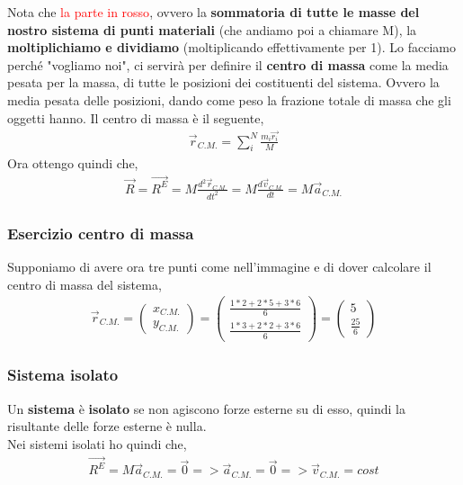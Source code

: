         Nota che \textcolor{Red}{la parte in rosso}, ovvero la \textbf{sommatoria di tutte le masse del nostro sistema di punti materiali} (che andiamo poi a chiamare M), la \textbf{moltiplichiamo e dividiamo} (moltiplicando effettivamente per 1). Lo facciamo perché "vogliamo noi", ci servirà per definire il \textbf{centro di massa} come la media pesata per la massa, di tutte le posizioni dei costituenti del sistema. Ovvero la media pesata delle posizioni, dando come peso la frazione totale di massa che gli oggetti hanno. Il centro di massa è il seguente,
        \begin{align*}
            \vec{r}_{C.M.}=\sum_i^N \frac{m_i\vec{r_i}}{M}
        \end{align*}
        Ora ottengo quindi che,
        \begin{align*}
            \vec{R}=\vec{R^E}=M\frac{d^2\vec{r}_{C.M.}}{dt^2}=M\frac{d\vec{v}_{C.M.}}{dt}=M\vec{a}_{C.M.}
        \end{align*}

        \subsubsection{Esercizio centro di massa}
        Supponiamo di avere ora tre punti come nell'immagine e di dover calcolare il centro di massa del sistema,
        \begin{align*}
            \vec{r}_{C.M.}=
            \left(\begin{array}{c}x_{C.M.} \\y_{C.M.}\end{array} \right)=
            \left(\begin{array}{c}\frac{1*2+2*5+3*6}{6} \\\frac{1*3+2*2+3*6}{6}\end{array} \right)= \left(\begin{array}{c}5 \\\frac{25}{6}\end{array} \right)
        \end{align*}

        \subsubsection{Sistema isolato}
            Un \textbf{sistema} è \textbf{isolato} se non agiscono forze esterne su di esso, quindi la risultante delle forze esterne è nulla.\\
            Nei sistemi isolati ho quindi che,
            \begin{align*}
                \vec{R^E}=M\vec{a}_{C.M.}=\vec{0} => \vec{a}_{C.M.}=\vec{0} =>\vec{v}_{C.M.}=cost
            \end{align*}

